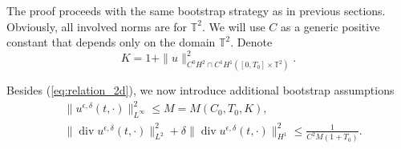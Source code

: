\documentclass[reqno,10pt]{amsart}
\theoremstyle{definition}
\theoremstyle{remark}
\numberwithin{equation}{section}
\DeclareMathOperator{\dive}{div}
\begin{document}
The proof proceeds with the same bootstrap strategy as in previous sections. Obviously, all involved norms are for $\mathbb T^2$. We will use $C$ as a generic positive constant that depends only on the domain $\mathbb T^2$. 
Denote
\[
    K = 1+\|u\|_{C^0H^2\cap C^1H^1 ([0,T_0]\times \mathbb T^2)}^2.
\]

Besides (\ref{eq:relation_2d}), we now introduce additional bootstrap assumptions
\begin{subequations} \label{eq:assumpt_2d}
\begin{align}
    &\|u^{\epsilon,\delta}(t,\cdot)\|_{L^\infty}^2 \le M=M(C_0,T_0,K), \label{eq:assump_2d_a}\\
    &\|\dive u^{\epsilon,\delta}(t,\cdot)\|_{L^2}^2 + \delta \|\dive u^{\epsilon,\delta}(t,\cdot)\|_{H^1}^2 \le \frac{1}{C^2 M(1+T_0)}. \label{eq:assump_2d_b}
\end{align}
\end{subequations}
\end{document}
